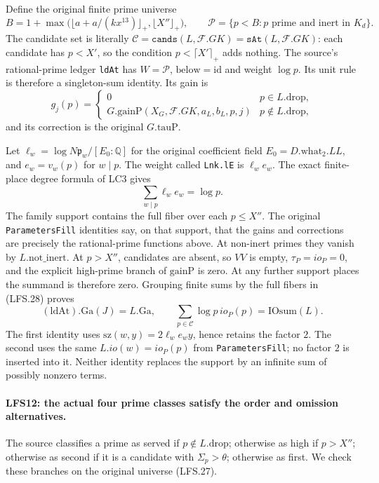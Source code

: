 Define the original finite prime universe
\[
 B=1+\max\bigl(\lfloor a+a/(kx^{13})\rfloor_+,
                                  \lfloor X''\rfloor_+\bigr),
 \qquad\mathcal P=\{p<B:p\text{ prime and inert in }K_d\}.    \tag{LFS.27}
\]
The candidate set is literally
$\mathcal C=\texttt{cands}(L,\mathcal F.GK)
 =\texttt{sAt}(L,\mathcal F.GK)$: each candidate has $p<X'$,
so the condition $p<\lceil X'\rceil_+$ adds nothing.
The source's rational-prime ledger \texttt{ldAt} has
$W=\mathcal P$, $\mathrm{below}=\mathrm{id}$ and weight
$\log p$.  Its unit rule is therefore a singleton-sum identity.
Its gain is
\[
 g_j(p)=\begin{cases}0&p\in L.\mathrm{drop},\\
 G.\mathrm{gainP}(X_G,\mathcal F.GK,a_L,b_L,p,j)&p\notin L.\mathrm{drop},
 \end{cases}
\]
and its correction is the original $G.\mathrm{tauP}$.

Let $\ell_w=\log N\mathfrak p_w/[E_0:\mathbb Q]$ for the
original coefficient field $E_0=D.\mathrm{what}_2.LL$, and
$e_w=v_w(p)$ for $w\mid p$.  The weight called
\texttt{Lnk.lE} is $\ell_we_w$.
The exact finite-place degree formula of LC3 gives
\[
                       \sum_{w\mid p}\ell_we_w=\log p.       \tag{LFS.28}
\]
The family support contains the full fiber over each $p\le X''$.
The original \texttt{ParametersFill} identities say, on that
support, that the gains and corrections are precisely the
rational-prime functions above.  At non-inert primes they
vanish by $L.\mathrm{not\_inert}$.  At $p>X''$, candidates
are absent, so $VV$ is empty, $\tau_P=io_P=0$, and the
explicit high-prime branch of $\mathrm{gainP}$ is zero.
At any further support places the summand is therefore zero.
Grouping finite sums by the full fibers in (LFS.28) proves
\[
 \boxed{\quad
 (\mathrm{ldAt}) .\mathrm{Ga}(J)=L.\mathrm{Ga},\qquad
 \sum_{p\in\mathcal C}\log p\,io_P(p)=\mathrm{IOsum}(L).
 \quad}                                                       \tag{LFS.29}
\]
The first identity uses
$\mathrm{sz}(w,y)=2\ell_we_wy$, hence retains the factor $2$.
The second uses the same $L.io(w)=io_P(p)$ from
\texttt{ParametersFill}; no factor $2$ is inserted into it.
Neither identity replaces the support by an infinite sum of
possibly nonzero terms.

\paragraph{LFS12: the actual four prime classes satisfy the order and omission alternatives.}
\label{claim:LFS12}
The source classifies a prime as served if $p\notin L.\mathrm{drop}$;
otherwise as high if $p>X''$; otherwise as second if it is a
candidate with $\Sigma_p>\theta$; otherwise as first.
We check these branches on the original universe (LFS.27).

